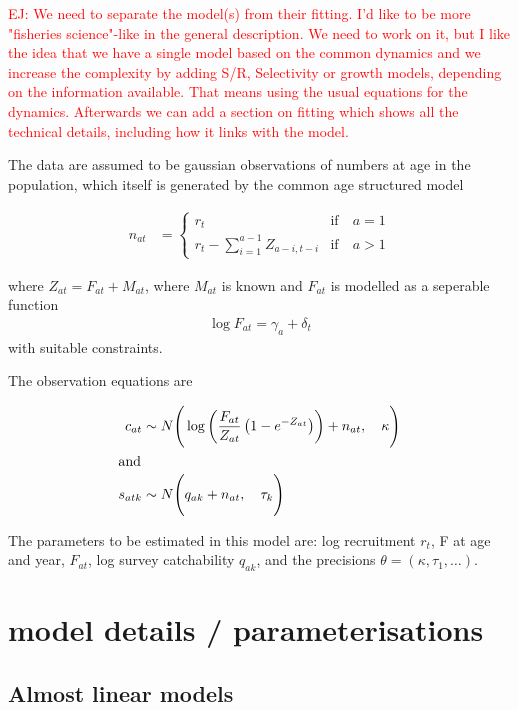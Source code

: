 \documentclass[a4paper,english]{article}
\begin{document}
\textcolor{red}{EJ: We need to separate the model(s) from their fitting. I'd like to be more "fisheries science"-like in the general description. We need to work on it, but I like the idea that we have a single model based on the common dynamics and we increase the complexity by adding S/R, Selectivity or growth models, depending on the information available. That means using the usual equations for the dynamics. Afterwards we can add a section on fitting which shows all the technical details, including how it links with the model.}

The data are assumed to be gaussian observations of numbers at age in the population, which itself is generated by the common age structured model

\begin{align}
  n_{at} &= 
  \left\lbrace 
    \begin{array}{ll}
      r_t & \text{if} \quad a = 1 \\
      r_t -\sum_{i=1}^{a-1} Z_{a-i,t-i} & \text{if} \quad a > 1
    \end{array} \right.
\end{align}

where $Z_{at} = F_{at} + M_{at}$, where $M_{at}$ is known and $F_{at}$ is modelled as a seperable function
\begin{align}
  \log F_{at} = \gamma_a + \delta_t
\end{align}
with suitable constraints.

The observation equations are

\begin{align}
 c_{at} &\sim N \Bigg( \log \left( \frac{F_{at}}{Z_{at}} \left( 1 - e^{-Z_{at}} \right)\right) + n_{at}, \quad \kappa \Bigg) \\
\intertext{and} 
 s_{atk} &\sim N\Bigg( q_{ak} + n_{at}, \quad \tau_k \Bigg)
\end{align}  


The parameters to be estimated in this model are: log recruitment $r_t$, F at age and year, $F_{at}$, log survey catchability $q_{ak}$, and the precisions $\theta = (\kappa, \tau_1, \ldots)$. 

\section{model details / parameterisations}

\subsection{Almost linear models}
\end{document}
